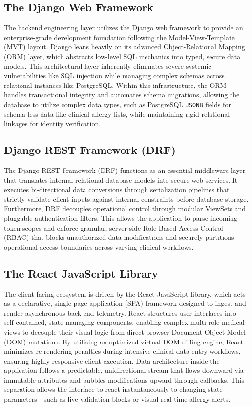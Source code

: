 \documentclass[12pt, a4paper]{report}
\numberwithin{equation}{chapter}
\begin{document}
\subsection{The Django Web Framework}
The backend engineering layer utilizes the Django web framework to provide an enterprise-grade development foundation following the Model-View-Template (MVT) layout. Django leans heavily on its advanced Object-Relational Mapping (ORM) layer, which abstracts low-level SQL mechanics into typed, secure data models. This architectural layer inherently eliminates severe systemic vulnerabilities like SQL injection while managing complex schemas across relational instances like PostgreSQL. Within this infrastructure, the ORM handles transactional integrity and automates schema migrations, allowing the database to utilize complex data types, such as PostgreSQL \texttt{JSONB} fields for schema-less data like clinical allergy lists, while maintaining rigid relational linkages for identity verification.

\subsection{Django REST Framework (DRF)}
The Django REST Framework (DRF) functions as an essential middleware layer that translates internal relational database models into secure web services. It executes bi-directional data conversions through serialization pipelines that strictly validate client inputs against internal constraints before database storage. Furthermore, DRF decouples operational control through modular ViewSets and pluggable authentication filters. This allows the application to parse incoming token scopes and enforce granular, server-side Role-Based Access Control (RBAC) that blocks unauthorized data modifications and securely partitions operational access boundaries across varying clinical workflows.

\subsection{The React JavaScript Library}
The client-facing ecosystem is driven by the React JavaScript library, which acts as a declarative, single-page application (SPA) framework designed to ingest and render asynchronous back-end telemetry. React structures user interfaces into self-contained, state-managing components, enabling complex multi-role medical views to decouple their visual logic from direct browser Document Object Model (DOM) mutations. By utilizing an optimized virtual DOM diffing engine, React minimizes re-rendering penalties during intensive clinical data entry workflows, ensuring highly responsive client execution. Data architecture inside the application follows a predictable, unidirectional stream that flows downward via immutable attributes and bubbles modifications upward through callbacks. This separation allows the interface to react instantaneously to changing state parameters—such as live validation blocks or visual real-time allergy alerts.
\end{document}
